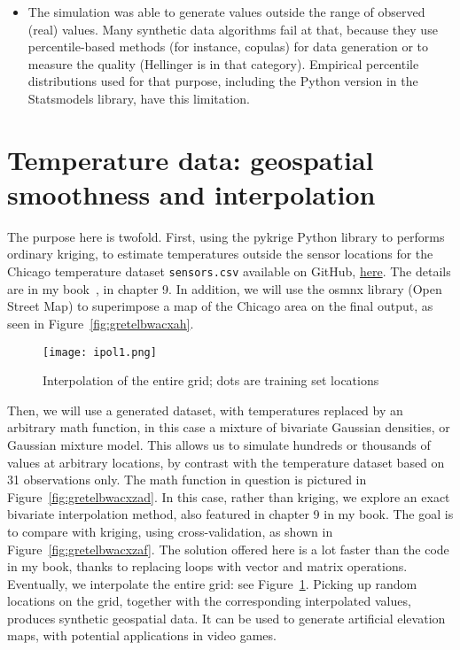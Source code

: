 \documentclass[oneside,10pt]{book}
\begin{document}
\begin{itemize}
\item The simulation was able to generate values outside the range of observed (real) values. Many synthetic data algorithms fail at that, because they use percentile-based methods (for instance, copulas) for data generation or to measure the quality (Hellinger is in that category). Empirical percentile distributions used for that purpose, including the Python version in the \textcolor{index}{Statsmodels} library, have this limitation. 
\end{itemize}

\section{Temperature data: geospatial smoothness and interpolation}\label{georeshy}

The purpose here is twofold. First, using the \textcolor{index}{pykrige} Python library 
 to performs ordinary \textcolor{index}{kriging}, to estimate temperatures outside the sensor locations
 for the Chicago temperature dataset \texttt{sensors.csv} available on GitHub, 
 \href{https://raw.githubusercontent.com/VincentGranville/Statistical-Optimization/main/sensors.csv}{here}. The details are in my book~\cite{vgelsevier}, in chapter 9. In addition, we will use
 the \textcolor{index}{osmnx} library (Open Street Map) to superimpose a map of the Chicago area on the final output, as seen
 in Figure~\ref{fig:gretelbwacxah}.

\begin{figure}[H]
\centering
\texttt{[image: ipol1.png]}   
\caption{Interpolation of the entire grid; dots are training set locations}
\label{fig:gretelbwacxzas}
\end{figure}

Then, we will use a generated dataset, with temperatures replaced by an arbitrary math function, in this case a mixture of bivariate Gaussian densities, or 
\textcolor{index}{Gaussian mixture model}. This allows us to simulate hundreds or thousands of values at arbitrary locations, by contrast with the temperature dataset based on 31 observations only. The math function in question is pictured in Figure~\ref{fig:gretelbwacxzad}.
In this case, rather than kriging, we explore an 
\textcolor{index}{exact bivariate interpolation} method, also featured in chapter 9 in my book. The goal is to compare with kriging, using \textcolor{index}{cross-validation}, as shown
 in Figure~\ref{fig:gretelbwacxzaf}. The solution offered here is a lot faster than the code in my book, thanks to replacing loops with vector and matrix operations. Eventually, we interpolate the entire grid:
 see Figure~\ref{fig:gretelbwacxzas}. Picking up random locations on the grid, together with the corresponding interpolated values, produces 
\textcolor{index}{synthetic geospatial data}.
 It can be used to generate artificial elevation maps, with potential applications in video games.
\end{document}
